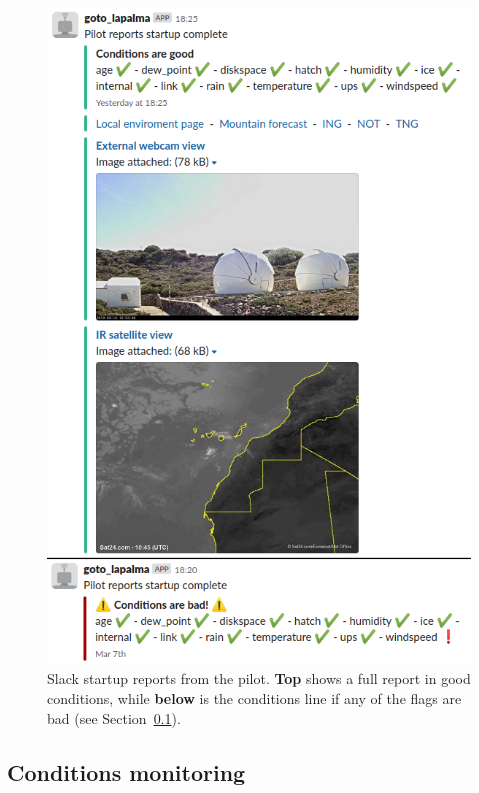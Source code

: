 \begin{colsection}
\begin{colsection}
\begin{figure}[p]
\begin{center}
\includegraphics[width=0.85\linewidth]{images/slack.png}
\end{center}
\caption[Slack startup reports from the pilot]{Slack startup reports from the pilot. \textbf{Top} shows a full
report in good conditions, while \textbf{below} is the conditions line if any of the flags are bad (see Section~\ref{sec:conditions}).
}
\label{fig:slack}
\end{figure}

\end{colsection}


\subsection{Conditions monitoring}
\label{sec:conditions}
\begin{colsection}


\end{colsection}
\end{colsection}
